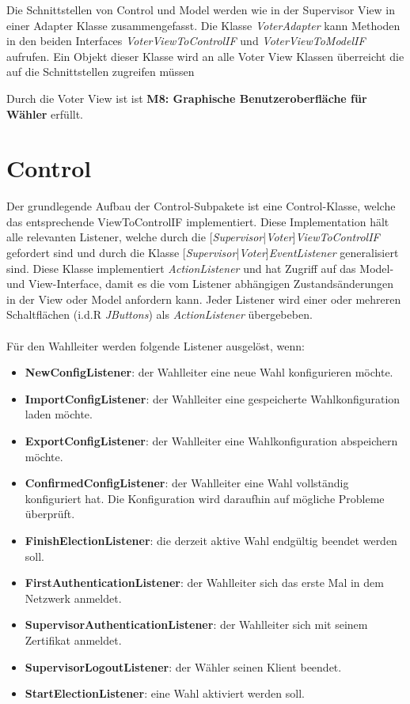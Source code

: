 \documentclass[parskip=full]{scrartcl}
\newcommand{\textitx}[1]{\mbox{\textit{#1}}}
\newcommand{\fakeparagraph}[1]{\textbf{#1}}
\begin{document}
		Die Schnittstellen von Control und Model werden wie in der Supervisor View in einer Adapter Klasse zusammengefasst. Die Klasse \textitx{VoterAdapter} kann Methoden in den beiden Interfaces \textit{VoterViewToControlIF} und \textit{VoterViewToModelIF} aufrufen. Ein Objekt dieser Klasse wird an alle Voter View Klassen überreicht die auf die Schnittstellen zugreifen müssen
		
		Durch die Voter View ist ist \textbf{M8: Graphische Benutzeroberfläche für Wähler} erfüllt.
	\newpage

	\section{Control}\label{sec:control}
	Der grundlegende Aufbau der Control-Subpakete ist eine Control-Klasse, welche das entsprechende ViewToControlIF implementiert. Diese Implementation hält alle relevanten Listener, welche durch die [\textitx{Supervisor}|\textitx{Voter}]\textitx{ViewToControlIF} gefordert sind und durch die Klasse [\textitx{Supervisor}|\textitx{Voter}]\textitx{EventListener} generalisiert sind. Diese Klasse implementiert \textitx{ActionListener} und hat Zugriff auf das Model- und View-Interface, damit es die vom Listener abhängigen Zustandsänderungen in der View oder Model anfordern kann. Jeder Listener wird einer oder mehreren Schaltflächen (i.d.R \textitx{JButtons}) als \textitx{ActionListener} übergebeben.\\
	\\
	Für den Wahlleiter werden folgende Listener ausgelöst, wenn:
	\begin{itemize}
		\item\fakeparagraph{NewConfigListener}: der Wahlleiter eine neue Wahl konfigurieren möchte.
		\item\fakeparagraph{ImportConfigListener}: der Wahlleiter eine gespeicherte Wahlkonfiguration laden möchte.
		\item\fakeparagraph{ExportConfigListener}: der Wahlleiter eine Wahlkonfiguration abspeichern möchte.
		\item\fakeparagraph{ConfirmedConfigListener}: der Wahlleiter eine Wahl vollständig konfiguriert hat. Die Konfiguration wird daraufhin auf mögliche Probleme überprüft.
		\item\fakeparagraph{FinishElectionListener}: die derzeit aktive Wahl endgültig beendet werden soll. 
		\item\fakeparagraph{FirstAuthenticationListener}: der Wahlleiter sich das erste Mal in dem Netzwerk anmeldet.
		\item\fakeparagraph{SupervisorAuthenticationListener}: der Wahlleiter sich mit seinem Zertifikat anmeldet.
		\item\fakeparagraph{SupervisorLogoutListener}: der Wähler seinen Klient beendet.
		\item\fakeparagraph{StartElectionListener}: eine Wahl aktiviert werden soll.
	\end{itemize}
	
\end{document}
